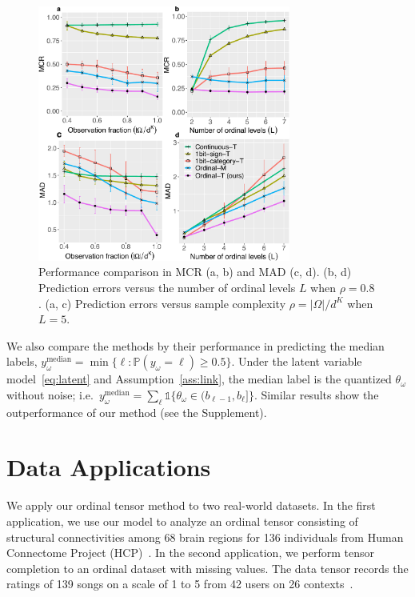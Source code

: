 \documentclass{article}
\theoremstyle{plain}
\theoremstyle{definition}
\begin{document}
\begin{figure}[t]
\includegraphics[width=8.3cm]{panel2.pdf}
\vspace{-.4cm}
\caption{Performance comparison in MCR (a, b) and MAD (c, d). (b, d) Prediction errors versus the number of ordinal levels $L$ when $\rho=0.8$. (a, c) Prediction errors versus sample complexity $\rho=|\Omega|/d^K$ when $L=5$. }\label{fig:compare}
\vspace{-.4cm}
\end{figure}


We also compare the methods by their performance in predicting the median labels, $y_\omega^{\text{median}}=\min\{\ell\colon\mathbb{P}(y_\omega=\ell)\geq 0.5\}$. Under the latent variable model~\eqref{eq:latent} and Assumption~\ref{ass:link}, the median label is the quantized $\theta_\omega$ without noise; i.e.\ $y_\omega^{\text{median}}=\sum_\ell \mathds{1}\{\theta_\omega\in(b_{\ell-1},b_\ell]\}$. Similar results show the outperformance of our method (see the Supplement).


\section{Data Applications}
We apply our ordinal tensor method to two real-world datasets. In the first application, we use our model to analyze an ordinal tensor consisting of structural connectivities among 68 brain regions for 136 individuals from Human Connectome Project (HCP)~\citep{geddes2016human}. In the second application, we perform tensor completion to an ordinal dataset with missing values. The data tensor records the ratings of 139 songs on a scale of 1 to 5 from 42 users on 26 contexts~\citep{baltrunas2011incarmusic}.
\end{document}
